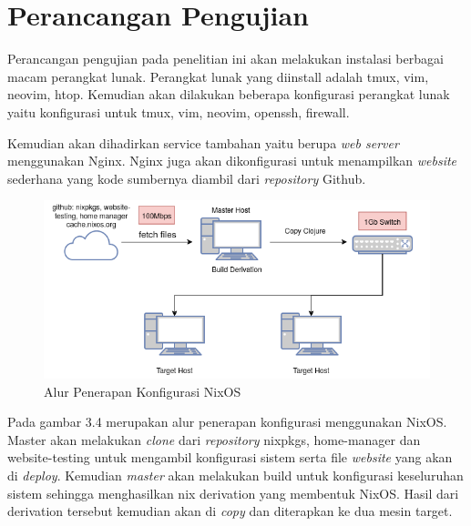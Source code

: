 \documentclass[10pt,]{report}
\begin{document}
\section{Perancangan Pengujian}
\begin{adjustwidth}{20pt}{}
	\hspace\parindent
	Perancangan pengujian pada penelitian ini akan melakukan instalasi berbagai
	macam perangkat lunak. Perangkat lunak yang diinstall adalah tmux, vim,
	neovim, htop. Kemudian akan dilakukan beberapa konfigurasi perangkat lunak
	yaitu konfigurasi untuk tmux, vim, neovim, openssh, firewall.

	Kemudian akan dihadirkan service tambahan yaitu berupa \textit{web server}
	menggunakan Nginx. Nginx juga akan dikonfigurasi untuk menampilkan
	\textit{website} sederhana yang kode sumbernya diambil dari
	\textit{repository} Github.
	\begin{figure}[H]
		\centering
		\includegraphics[width=\textwidth]{images/nixos-topology-revision.png}
		\caption{Alur Penerapan Konfigurasi NixOS}
	\end{figure}

	Pada gambar 3.4 merupakan alur penerapan konfigurasi menggunakan NixOS.
	Master akan melakukan \textit{clone} dari \textit{repository} nixpkgs,
	home-manager dan website-testing untuk mengambil konfigurasi sistem serta
	file \textit{website} yang akan di \textit{deploy}. Kemudian \textit{master}
	akan melakukan build untuk konfigurasi keseluruhan sistem sehingga
	menghasilkan nix derivation yang membentuk NixOS. Hasil dari derivation
	tersebut kemudian akan di \textit{copy} dan diterapkan ke dua mesin target.


\end{adjustwidth}
\end{document}
